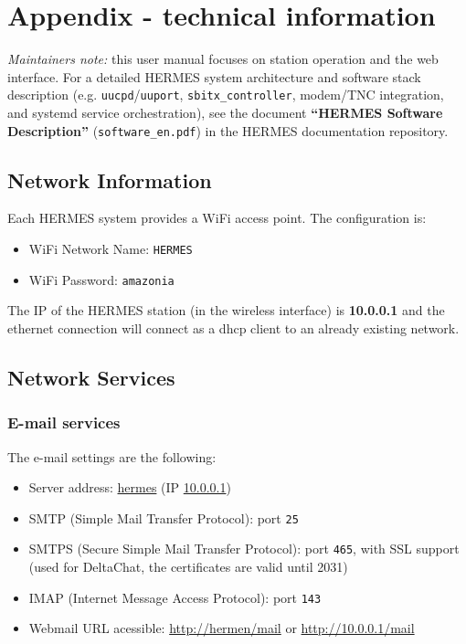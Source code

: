 \pagebreak
\ifdefined\HERMESCOMBINED
\else
{}
\fi
\label{techinfo}
\section{Appendix - technical information}
\textit{Maintainers note:} this user manual focuses on station operation and the web interface.
For a detailed HERMES system architecture and software stack description (e.g. \texttt{uucpd}/\texttt{uuport}, \texttt{sbitx\_controller},
modem/TNC integration, and systemd service orchestration), see the document \textbf{``HERMES Software Description''} (\texttt{software\_en.pdf})
in the HERMES documentation repository.
\subsection{Network Information}
\label{apx_net_info}

Each HERMES system provides a WiFi access point. The configuration is:
\begin{itemize}
\item WiFi Network Name: \texttt{HERMES}
\item WiFi Password: \texttt{amazonia}
\end{itemize}

The IP of the HERMES station (in the wireless interface) is \textbf{10.0.0.1} and the ethernet connection will connect as a dhcp client to an already existing network. 

\subsection{Network Services} 
\label{apx_net_services}

\subsubsection{E-mail services}
\label{apx_net_email}

The e-mail settings are the following:

\begin{itemize}
    \item Server address: \url{hermes} (IP \url{10.0.0.1})
    \item SMTP (Simple Mail Transfer Protocol): port \texttt{25}
    \item SMTPS (Secure Simple Mail Transfer Protocol): port \texttt{465}, with SSL support 
    (used for DeltaChat, the certificates are valid until 2031)
    \item IMAP (Internet Message Access Protocol): port \texttt{143}
    \item Webmail URL acessible: \url{http://hermen/mail} or \url{http://10.0.0.1/mail}
\end{itemize}


